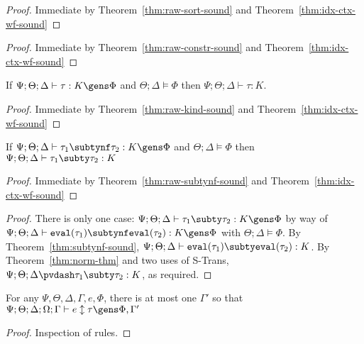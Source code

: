 \sortsound*
\begin{proof}
Immediate by Theorem~\ref{thm:raw-sort-sound} and Theorem~\ref{thm:idx-ctx-wf-sound}
\end{proof}


\constrsound*
\begin{proof}
Immediate by Theorem~\ref{thm:raw-constr-sound} and Theorem~\ref{thm:idx-ctx-wf-sound}
\end{proof}

\begin{theorem}
If $\Psi ; \Theta ; \Delta \vdash \tau : K \gens \Phi$ and $\Theta ; \Delta \vDash \Phi$ then $\Psi ; \Theta ; \Delta \vdash \tau : K$.
\label{thm:raw-kind-sound}
\end{theorem}


\kindsound*
\begin{proof}
Immediate by Theorem~\ref{thm:raw-kind-sound} and Theorem~\ref{thm:idx-ctx-wf-sound}
\end{proof}

\begin{theorem}
If $\Psi ; \Theta ; \Delta \vdash \tau_1 \subtynf \tau_2 : K \gens \Phi$ and $\Theta ; \Delta \vDash \Phi$ then $\Psi ; \Theta ; \Delta \vdash \tau_1 \subty \tau_2 : K$\label{thm:raw-subtynf-sound}
\end{theorem}


\subtynfsound*
\begin{proof}
Immediate by Theorem~\ref{thm:raw-subtynf-sound} and Theorem~\ref{thm:idx-ctx-wf-sound}
\end{proof}

\subtysound*
\begin{proof}
There is only one case: $\Psi ; \Theta ; \Delta \vdash \tau_1 \subty\tau_2 : K \gens \Phi$ by way of $\Psi ; \Theta ; \Delta \vdash \texttt{eval}(\tau_1) \subtynf \texttt{eval}(\tau_2) : K \gens \Phi$ with $\Theta ; \Delta \vDash \Phi$. By Theorem~\ref{thm:subtynf-sound}, $\Psi ; \Theta ; \Delta \vdash \texttt{eval}(\tau_1) \subty \texttt{eval}(\tau_2) : K$. By Theorem~\ref{thm:norm-thm} and two uses of S-Trans, $\Psi ; \Theta ; \Delta \pvdash \tau_1 \subty \tau_2 : K$, as required.
\end{proof}

\begin{theorem}
For any $\Psi,\Theta,\Delta,\Gamma,e,\Phi$, there is at most one $\Gamma'$ so that $\Psi ; \Theta ; \Delta ; \Omega ; \Gamma \vdash e \updownarrow \tau \gens \Phi, \Gamma'$
\label{thm:ctx-uniquely-determined}
\end{theorem}
\begin{proof}
Inspection of rules.
\end{proof}

